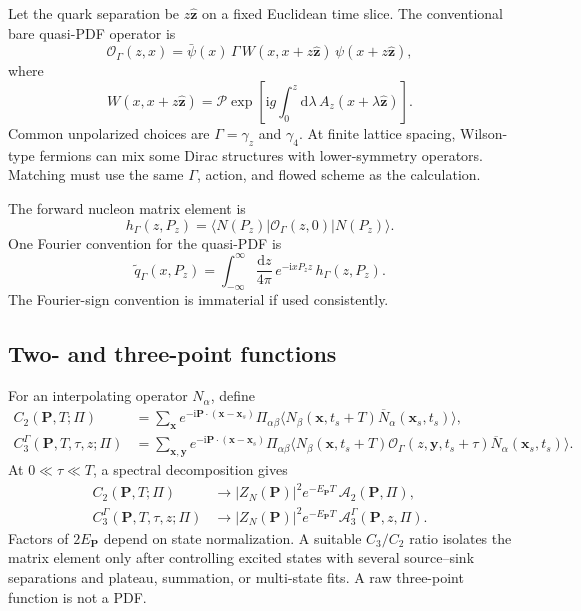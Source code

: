 \documentclass[11pt]{article}
\numberwithin{equation}{section}
\newcommand{\dd}{\mathrm{d}}
\newcommand{\ii}{\mathrm{i}}
\newcommand{\cO}{\mathcal{O}}
\newcommand{\qtilde}{\widetilde q}
\begin{document}
Let the quark separation be \(z\hat{\bm z}\) on a fixed Euclidean time slice.
The conventional bare quasi-PDF operator is
\begin{equation}
  \cO_\Gamma(z,x)
  =
  \bar\psi(x)\,
  \Gamma\,
  W(x,x+z\hat{\bm z})\,
  \psi(x+z\hat{\bm z}),
  \label{eq:bare-quasi-operator}
\end{equation}
where
\begin{equation}
  W(x,x+z\hat{\bm z})
  =
  \mathcal{P}\exp\left[
    \ii g\int_0^z\dd\lambda\,
    A_z(x+\lambda\hat{\bm z})
  \right].
\end{equation}
Common unpolarized choices are \(\Gamma=\gamma_z\) and \(\gamma_4\). At finite
lattice spacing, Wilson-type fermions can mix some Dirac structures with
lower-symmetry operators. Matching must use the same \(\Gamma\), action, and
flowed scheme as the calculation.

The forward nucleon matrix element is
\begin{equation}
  h_\Gamma(z,P_z)
  =
  \langle N(P_z)|\cO_\Gamma(z,0)|N(P_z)\rangle.
\end{equation}
One Fourier convention for the quasi-PDF is
\begin{equation}
  \qtilde_\Gamma(x,P_z)
  =
  \int_{-\infty}^{\infty}\frac{\dd z}{4\pi}\,
  e^{-\ii xP_z z}\,
  h_\Gamma(z,P_z).
  \label{eq:quasi-fourier}
\end{equation}
The Fourier-sign convention is immaterial if used consistently.

\subsection{Two- and three-point functions}

For an interpolating operator \(N_\alpha\), define
\begin{align}
  C_2(\bm P,T;\Pi)
  &=
  \sum_{\bm x}e^{-\ii\bm P\cdot(\bm x-\bm x_s)}
  \Pi_{\alpha\beta}
  \langle N_\beta(\bm x,t_s+T)
          \overline N_\alpha(\bm x_s,t_s)\rangle,
  \\
  C_3^\Gamma(\bm P,T,\tau,z;\Pi)
  &=
  \sum_{\bm x,\bm y}e^{-\ii\bm P\cdot(\bm x-\bm x_s)}
  \Pi_{\alpha\beta}
  \langle N_\beta(\bm x,t_s+T)
          \cO_\Gamma(z,\bm y,t_s+\tau)
          \overline N_\alpha(\bm x_s,t_s)\rangle .
  \label{eq:c2-c3-definitions}
\end{align}
At \(0\ll\tau\ll T\), a spectral decomposition gives
\begin{align}
  C_2(\bm P,T;\Pi)
  &\longrightarrow
  |Z_N(\bm P)|^2 e^{-E_{\bm P}T}\,
  \mathcal A_2(\bm P,\Pi),
  \\
  C_3^\Gamma(\bm P,T,\tau,z;\Pi)
  &\longrightarrow
  |Z_N(\bm P)|^2 e^{-E_{\bm P}T}\,
  \mathcal A_3^\Gamma(\bm P,z,\Pi).
\end{align}
Factors of \(2E_{\bm P}\) depend on state normalization. A suitable \(C_3/C_2\)
ratio isolates the matrix element only after controlling excited states with
several source--sink separations and plateau, summation, or multi-state fits.
A raw three-point function is not a PDF.
\end{document}
